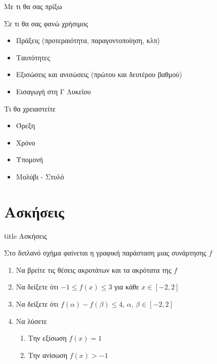 \documentclass{presentation}
\begin{document}
\begin{frame}{Με τι θα σας πρίξω}
\end{frame}

\begin{frame}{Σε τι θα σας φανώ χρήσιμος}
  \begin{itemize}
    \item Πράξεις (προτεραιότητα, παραγοντοποίηση, κλπ)
    \item Ταυτότητες
    \item Εξισώσεις και ανισώσεις (πρώτου και δευτέρου βαθμού)
    \item Εισαγωγή στη Γ Λυκείου
  \end{itemize}
\end{frame}

\begin{frame}{Τι θα χρειαστείτε}
  \begin{itemize}[<+->]
    \item Όρεξη
    \item Χρόνο
    \item Υπομονή
    \item Μολύβι - Στυλό
  \end{itemize}
\end{frame}

\section{Ασκήσεις}

\begin{frame}[noframenumbering]
  \vfill
  \centering
  \begin{beamercolorbox}[sep=8pt,center,shadow=true,rounded=true]{title}
    Ασκήσεις
  \end{beamercolorbox}
  \vfill
\end{frame}

\begin{askisi}
  Στο διπλανό σχήμα φαίνεται η γραφική παράσταση μιας συνάρτησης $f$
  \begin{enumerate}
    \item Να βρείτε τις θέσεις ακροτάτων και τα ακρότατα της $f$\pause
    \item Να δείξετε ότι $-1\le f(x) \le 3$ για κάθε $x\in[-2,2]$\pause
    \item Να δείξετε ότι $f(α)-f(β)\le 4$, $α$, $β\in[-2,2]$ \pause
    \item Να λύσετε
          \begin{enumerate}
            \item Την εξίσωση $f(x)=1$ \pause
            \item Την ανίσωση $f(x)>-1$
          \end{enumerate}
  \end{enumerate}

\end{askisi}

\moodle
\end{document}
